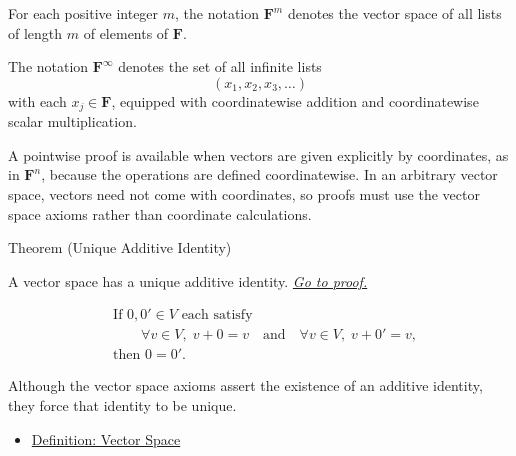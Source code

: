 \begin{remark*}[Notation]
For each positive integer $m$, the notation $\mathbf{F}^m$ denotes the vector
space of all lists of length $m$ of elements of $\mathbf{F}$.

The notation $\mathbf{F}^{\infty}$ denotes the set of all infinite lists
\[
(x_1,x_2,x_3,\dots)
\]
with each $x_j \in \mathbf{F}$, equipped with coordinatewise addition and
coordinatewise scalar multiplication.
\end{remark*}

\begin{remark*}
A pointwise proof is available when vectors are given explicitly by coordinates, as in $\mathbf{F}^n$, because the operations are defined coordinatewise. In an arbitrary vector space, vectors need not come with coordinates, so proofs must use the vector space axioms rather than coordinate calculations.
\end{remark*}


\begin{theorembox}{Theorem (Unique Additive Identity)}
\begin{theorem}
\label{thm:unique-additive-identity}
A vector space has a unique additive identity.
\hyperref[prf:unique-additive-identity]{\textit{Go to proof.}}
\end{theorem}
\end{theorembox}

\begin{remark*}
\[
\begin{aligned}
&\text{If } 0,0' \in V \text{ each satisfy} \\
&\qquad \forall v \in V,\; v+0=v
\quad\text{and}\quad
\forall v \in V,\; v+0'=v, \\
&\text{then } 0=0'.
\end{aligned}
\]
\end{remark*}

\begin{remark*}[Interpretation]
Although the vector space axioms assert the existence of an additive identity,
they force that identity to be unique.
\end{remark*}

\begin{dependencies}
\begin{itemize}
  \item \hyperref[def:vector-space]{Definition: Vector Space}
\end{itemize}
\end{dependencies}

